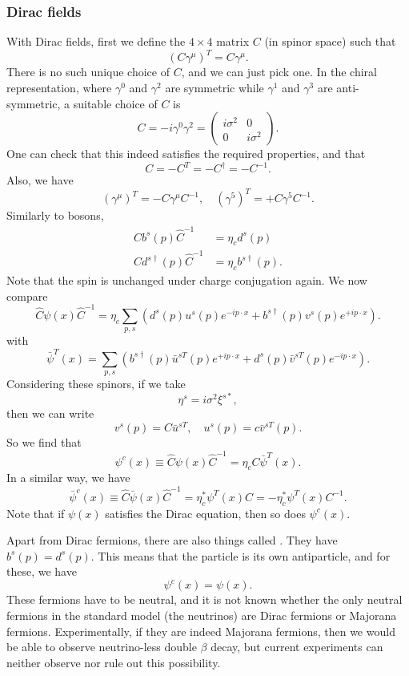 \documentclass[a4paper]{article}
\begin{document}
\subsubsection*{Dirac fields}
With Dirac fields, first we define the $4 \times 4$ matrix $C$ (in spinor space) such that
\[
  (C \gamma^\mu)^T = C \gamma^\mu.
\]
There is no such unique choice of $C$, and we can just pick one. In the chiral representation, where $\gamma^0$ and $\gamma^2$ are symmetric while $\gamma^1$ and $\gamma^3$ are anti-symmetric, a suitable choice of $C$ is
\[
  C = -i \gamma^0 \gamma^2 =
  \begin{pmatrix}
    i \sigma^2 & 0\\
    0 & i \sigma^2
  \end{pmatrix}.
\]
One can check that this indeed satisfies the required properties, and that
\[
  C = -C^T = - C^\dagger = -C^{-1}.
\]
Also, we have
\[
  (\gamma^\mu)^T = - C \gamma^\mu C^{-1},\quad (\gamma^5)^T = + C \gamma^5 C^{-1}.
\]
Similarly to bosons,
\begin{align*}
  \hat{C} b^s(p) \hat{C}^{-1} &= \eta_c d^s(p)\\
  \hat{C} d^{s\dagger}(p) \hat{C}^{-1} &= \eta_c b^{s\dagger} (p).
\end{align*}
Note that the spin is unchanged under charge conjugation again. We now compare
\[
  \hat{C} \psi(x) \hat{C}^{-1} = \eta_c \sum_{p, s}\left(d^s(p) u^s(p)e^{-ip\cdot x} + b^{s\dagger} (p) v^s(p) e^{+ip\cdot x}\right).
\]
with
\[
  \bar\psi^T(x) = \sum_{p, s} \left( b^{s\dagger}(p) \bar{u}^{sT}(p) e^{+ip\cdot x} + d^s (p) \bar{v}^{sT}(p) e^{-ip\cdot x}\right).
\]
Considering these spinors, if we take
\[
  \eta^s = i \sigma^2 \xi^{s*},
\]
then we can write
\[
  v^s(p) = C \bar{u}^{sT},\quad u^s(p) = c \bar{v}^{sT}(p).
\]
So we find that
\[
  \psi^c(x) \equiv \hat{C} \psi(x) \hat{C}^{-1} = \eta_c C \bar\psi^T (x).
\]
In a similar way, we have
\[
  \bar\psi^c(x) \equiv \hat{C} \bar\psi(x) \hat{C}^{-1} = \eta_c^* \psi^T(x) C = - \eta_c^* \psi^T(x) C^{-1}.
\]
Note that if $\psi(x)$ satisfies the Dirac equation, then so does $\psi^c(x)$.

Apart from Dirac fermions, there are also things called . They have $b^s(p) = d^s(p)$. This means that the particle is its own antiparticle, and for these, we have
\[
  \psi^c(x) = \psi(x).
\]
These fermions have to be neutral, and it is not known whether the only neutral fermions in the standard model (the neutrinos) are Dirac fermions or Majorana fermions. Experimentally, if they are indeed Majorana fermions, then we would be able to observe neutrino-less double $\beta$ decay, but current experiments can neither observe nor rule out this possibility.
\end{document}
